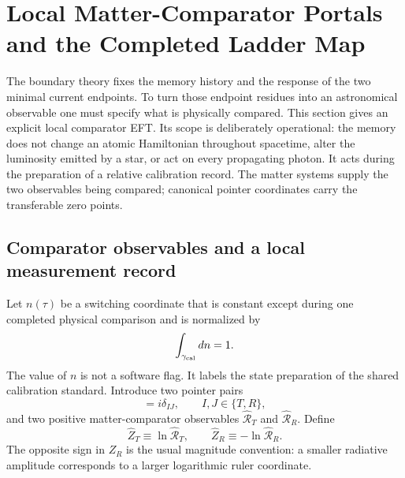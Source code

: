 \documentclass[aps,prd,twocolumn,10pt,superscriptaddress,nofootinbib]{revtex4-2}
\begin{document}
\section{Local Matter-Comparator Portals and the Completed Ladder Map}
\label{sec:portals_map}

The boundary theory fixes the memory history and the response of the two
minimal current endpoints.  To turn those endpoint residues into an
astronomical observable one must specify what is physically compared.  This
section gives an explicit local comparator EFT.  Its scope is deliberately
operational: the memory does not change an atomic Hamiltonian throughout
spacetime, alter the luminosity emitted by a star, or act on every propagating
photon.  It acts during the preparation of a relative calibration record.
The matter systems supply the two observables being compared; canonical
pointer coordinates carry the transferable zero points.

\subsection{Comparator observables and a local measurement record}
\label{sec:portal_pointer}

Let $n(\tau)$ be a switching coordinate that is constant except during one
completed physical comparison and is normalized by
\begin{equation}
 \int_{\gamma_{\rm cal}}dn=1 .
 \label{eq:portal_switch_unit}
\end{equation}
The value of $n$ is not a software flag.  It labels the state preparation of
the shared calibration standard.  Introduce two pointer pairs
\begin{equation}
 [\widehat y_I,\widehat p_J]=i\delta_{IJ},
 \qquad I,J\in\{T,R\},
 \label{eq:portal_pointer_algebra}
\end{equation}
and two positive matter-comparator observables $\widehat{\mathcal R}_T$ and
$\widehat{\mathcal R}_R$.  Define
\begin{equation}
 \widehat Z_T\equiv\ln\widehat{\mathcal R}_T,
 \qquad
 \widehat Z_R\equiv-\ln\widehat{\mathcal R}_R.
 \label{eq:portal_matter_logs}
\end{equation}
The opposite sign in $Z_R$ is the usual magnitude convention: a smaller
radiative amplitude corresponds to a larger logarithmic ruler coordinate.
\end{document}
